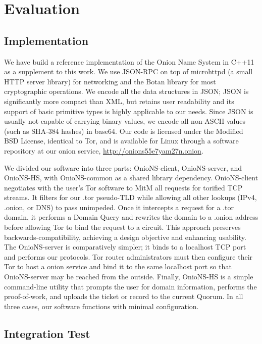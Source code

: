 \documentclass[USenglish,oneside,twocolumn]{article}
\begin{document}
\section{Evaluation}
\label{sec:Evaluation}

\subsection{Implementation}

We have build a reference implementation of the Onion Name System in C++11 as a supplement to this work. We use JSON-RPC on top of microhttpd \cite{microhttpd} (a small HTTP server library) for networking and the Botan \cite{BotanLib} library for most cryptographic operations. We encode all the data structures in JSON; JSON is significantly more compact than XML, but retains user readability and its support of basic primitive types is highly applicable to our needs. Since JSON is usually not capable of carrying binary values, we encode all non-ASCII values (such as SHA-384 hashes) in base64. Our code is licensed under the Modified BSD License, identical to Tor, and is available for Linux through a software repository at our onion service, \href{http://onions55e7yam27n.onion}{http://onions55e7yam27n.onion}.

We divided our software into three parts: OnioNS-client, OnioNS-server, and OnioNS-HS, with OnioNS-common as a shared library dependency. OnioNS-client negotiates with the user's Tor software to MitM all requests for torified TCP streams. It filters for our .tor pseudo-TLD while allowing all other lookups (IPv4, .onion, or DNS) to pass unimpeded. Once it intercepts a request for a .tor domain, it performs a Domain Query and rewrites the domain to a .onion address before allowing Tor to bind the request to a circuit. This approach preserves backwards-compatibility, achieving a design objective and enhancing usability. The OnioNS-server is comparatively simpler; it binds to a localhost TCP port and performs our protocols. Tor router administrators must then configure their Tor to host a onion service and bind it to the same localhost port so that OnioNS-server may be reached from the outside. Finally, OnioNS-HS is a simple command-line utility that prompts the user for domain information, performs the proof-of-work, and uploads the ticket or record to the current Quorum. In all three cases, our software functions with minimal configuration.

\subsection{Integration Test}
\end{document}
